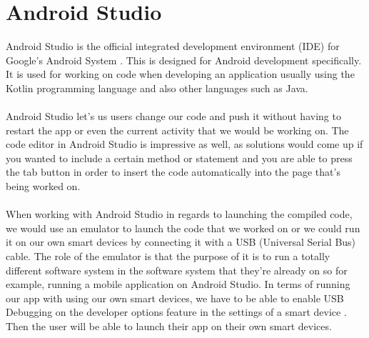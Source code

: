\section{Android Studio}
Android Studio is the official integrated development environment (IDE) for Google’s Android System \cite{androidStudio}. This is designed for Android development specifically. It is used for working on code when developing an application usually using the Kotlin programming language and also other languages such as Java.
\\
\\
Android Studio let’s us users change our code and push it without having to restart the app or even the current activity that we would be working on. The code editor in Android Studio is impressive as well, as solutions would come up if you wanted to include a certain method or statement and you are able to press the tab button in order to insert the code automatically into the page that’s being worked on.
\\
\\
When working with Android Studio in regards to launching the compiled code, we would use an emulator to launch the code that we worked on or we could run it on our own smart devices by connecting it with a USB (Universal Serial Bus) cable. The role of the emulator is that the purpose of it is to run a totally different software system in the software system that they’re already on so for example, running a mobile application on Android Studio. In terms of running our app with using our own smart devices, we have to be able to enable USB Debugging on the developer options feature in the settings of a smart device \cite{usbDebugging}. Then the user will be able to launch their app on their own smart devices.
\\
